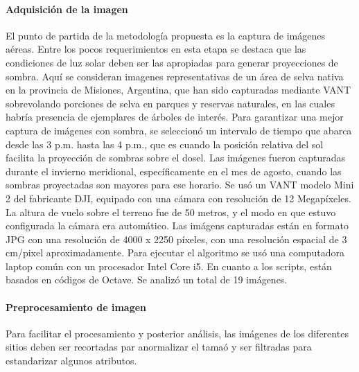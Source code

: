 \paragraph{Adquisición de la imagen}
El punto de partida de la metodología propuesta es la captura de imágenes aéreas. Entre los pocos requerimientos en esta etapa se destaca que las condiciones de luz solar deben ser las apropiadas para generar proyecciones de sombra. Aquí se consideran imagenes representativas de un área de selva nativa en la provincia de Misiones, Argentina, que han sido capturadas mediante VANT sobrevolando porciones de selva en parques y reservas naturales, en las cuales habría presencia de ejemplares de árboles de interés. Para garantizar una mejor captura de imágenes con sombra, se seleccionó un intervalo de tiempo que abarca desde las 3 p.m. hasta las 4 p.m., que es cuando la posición relativa del sol facilita la proyección de sombras sobre el dosel. Las imágenes fueron capturadas durante el invierno meridional, específicamente en el mes de agosto, cuando las sombras proyectadas son mayores para ese horario. Se usó un VANT modelo Mini 2 del fabricante DJI, equipado con una cámara con resolución de 12 Megapíxeles. La altura de vuelo sobre el terreno fue de 50 metros, y el modo en que estuvo configurada la cámara era automático. Las imágens capturadas están en formato JPG con una resolución de 4000 x 2250 píxeles, con una resolución espacial de 3 cm/pixel aproximadamente. Para ejecutar el algoritmo se usó una computadora laptop común con un procesador Intel Core i5. En cuanto a los scripts, están basados en códigos de Octave. Se analizó un total de 19 imágenes.

\paragraph{Preprocesamiento de imagen} 
Para facilitar el procesamiento y posterior análisis, las imágenes de los diferentes sitios deben ser recortadas par anormalizar el tamaó y ser filtradas para estandarizar algunos atributos.
